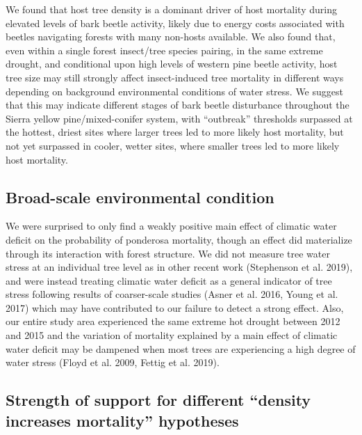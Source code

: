 \documentclass[]{article}
\begin{document}
We found that host tree density is a dominant driver of host mortality
during elevated levels of bark beetle activity, likely due to energy
costs associated with beetles navigating forests with many non-hosts
available. We also found that, even within a single forest insect/tree
species pairing, in the same extreme drought, and conditional upon high
levels of western pine beetle activity, host tree size may still
strongly affect insect-induced tree mortality in different ways
depending on background environmental conditions of water stress. We
suggest that this may indicate different stages of bark beetle
disturbance throughout the Sierra yellow pine/mixed-conifer system, with
``outbreak'' thresholds surpassed at the hottest, driest sites where
larger trees led to more likely host mortality, but not yet surpassed in
cooler, wetter sites, where smaller trees led to more likely host
mortality.

\subsection{Broad-scale environmental
condition}\label{broad-scale-environmental-condition}

We were surprised to only find a weakly positive main effect of climatic
water deficit on the probability of ponderosa mortality, though an
effect did materialize through its interaction with forest structure. We
did not measure tree water stress at an individual tree level as in
other recent work (Stephenson et al. 2019), and were instead treating
climatic water deficit as a general indicator of tree stress following
results of coarser-scale studies (Asner et al. 2016, Young et al. 2017)
which may have contributed to our failure to detect a strong effect.
Also, our entire study area experienced the same extreme hot drought
between 2012 and 2015 and the variation of mortality explained by a main
effect of climatic water deficit may be dampened when most trees are
experiencing a high degree of water stress (Floyd et al. 2009, Fettig et
al. 2019).

\subsection{\texorpdfstring{Strength of support for different ``density
increases mortality''
hypotheses}{Strength of support for different density increases mortality hypotheses}}\label{strength-of-support-for-different-density-increases-mortality-hypotheses}
\end{document}
